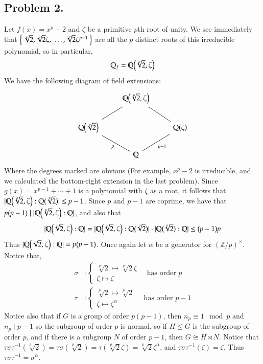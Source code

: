 \documentclass[12pt]{article}
\theoremstyle{definitionstyle}
\def\mbb#1{\mathbb{#1}}
\def\bQ{\mbb{Q}}
\newcommand{\Z}{\mbb Z}
\newcommand{\Q}{\mbb Q}
\begin{document}
		\subsection*{Problem 2.}
		Let $f(x) = x^p-2$ and $\zeta$ be a primitive $p$th root of unity. We see immediately that $\Set{\sqrt[p]{2}, \sqrt[p]{2}\zeta, \;\ldots, \sqrt[p]{2}\zeta^{p-1}}$ are all the $p$ distinct roots of this irreducible polynomial, so in particular,
		\begin{align*}
			\Q_f = \Q\qty(\sqrt[p]{2}, \zeta)
		\end{align*}
		We have the following diagram of field extensions:
		\[\begin{tikzcd}
			& {\bQ\qty(\sqrt[p]{2}, \zeta)} \\
			{\bQ\qty(\sqrt[p]{2})} && {\bQ\qty(\zeta)} \\
			& \bQ
			\arrow[no head, from=1-2, to=2-1]
			\arrow[no head, from=1-2, to=2-3]
			\arrow["p", no head, from=3-2, to=2-1]
			\arrow["{p-1}"', no head, from=3-2, to=2-3]
		\end{tikzcd}\]
		Where the degrees marked are obvious (For example, $x^p-2$ is irreducible, and we calculated the bottom-right extension in the last problem). Since $g(x) = x^{p-1} + \cdots + 1$ is a polynomial with $\zeta$ as a root, it follows that $|\Q\qty(\sqrt[p]{2}, \zeta) : \Q(\sqrt[p]{2})| \leq p-1$. Since $p$ and $p-1$ are coprime, we have that $p(p-1) \mid |\Q\qty(\sqrt[p]{2}, \zeta) : \Q|$, and also that
		\begin{align*}
			|\Q\qty(\sqrt[p]{2}, \zeta) : \Q| = |\Q\qty(\sqrt[p]{2}, \zeta) : \Q(\sqrt[p]{2})| \cdot |\Q(\sqrt[p]{2}) : \Q| \leq (p-1)p
		\end{align*}
		Thus $|\Q\qty(\sqrt[p]{2}, \zeta) : \Q| = p(p-1)$. Once again let $\alpha$ be a generator for $(\Z/p)^\times$. Notice that,
		\begin{align*}
			\sigma&: \begin{cases} \sqrt[p]{2} \mapsto \sqrt[p]{2}\zeta \\ \zeta \mapsto \zeta \end{cases} \quad \text{has order $p$} \\
			\tau&: \begin{cases} \sqrt[p]{2} \mapsto \sqrt[p]{2} \\ \zeta \mapsto \zeta^\alpha \end{cases}\quad \text{has order $p-1$}
		\end{align*}
		Notice also that if $G$ is a group of order $p(p-1)$, then $n_p \equiv 1 \mod p$ and $n_p \mid p-1$ so the subgroup of order $p$ is normal, so if $H \leq G$ is the subgroup of order $p$, and if there is a subgroup $N$ of order $p-1$, then $G \cong H \rtimes N$. Notice that $\tau \sigma \tau^{-1}(\sqrt[p]{2}) = \tau \sigma(\sqrt[p]{2}) = \tau(\sqrt[p]{2} \zeta) = \sqrt[p]{2} \zeta^\alpha$, and $\tau \sigma \tau^{-1}(\zeta) = \zeta$. Thus $\tau \sigma \tau^{-1} = \sigma^\alpha$.
		
\end{document}
